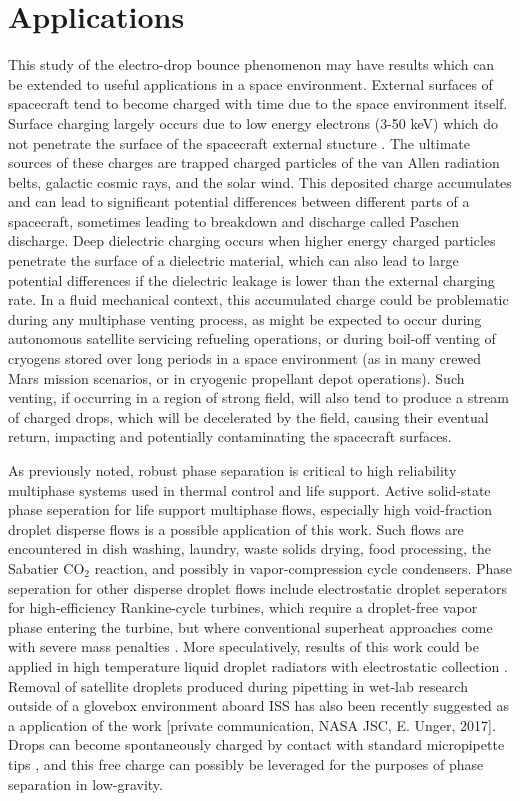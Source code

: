 \documentclass[12pt,a4paper,oneside]{book}
\begin{document}
\section{Applications}
This study of the electro-drop bounce phenomenon may have results which can be extended to useful applications in a space environment. External surfaces of spacecraft tend to become charged with time due to the space environment itself. Surface charging largely occurs due to low energy electrons (3-50 keV) which do not penetrate the surface of the spacecraft external stucture \cite{czepiela_charging_1997}. The ultimate sources of these charges are trapped charged particles of the van Allen radiation belts, galactic cosmic rays, and the solar wind. This deposited charge accumulates and can lead to significant potential differences between different parts of a spacecraft, sometimes leading to breakdown and discharge called Paschen discharge. Deep dielectric charging occurs when higher energy charged particles penetrate the surface of a dielectric material, which can also lead to large potential differences if the dielectric leakage is lower than the external charging rate. In a fluid mechanical context, this accumulated charge could be problematic during any multiphase venting process, as might be expected to occur during autonomous satellite servicing refueling operations, or during boil-off venting of cryogens stored over long periods in a space environment (as in many crewed Mars mission scenarios, or in cryogenic propellant depot operations). Such venting, if occurring in a region of strong field, will also tend to produce a stream of charged drops, which will be decelerated by the field, causing their eventual return, impacting and potentially contaminating the spacecraft surfaces.

As previously noted, robust phase separation is critical to high reliability multiphase systems used in thermal control and life support. Active solid-state phase seperation for life support multiphase flows, especially high void-fraction droplet disperse flows is a possible application of this work. Such flows are encountered in dish washing, laundry, waste solids drying, food processing, the Sabatier CO$_2$ reaction, and possibly in vapor-compression cycle condensers. Phase seperation for other disperse droplet flows include electrostatic droplet seperators for high-efficiency Rankine-cycle turbines, which require a droplet-free vapor phase entering the turbine, but where conventional superheat approaches come with severe mass penalties \cite{unterberg_zero_1962}. More speculatively, results of this work could be applied in high temperature liquid droplet radiators with electrostatic collection \cite{white_liquid_1987}. Removal of satellite droplets produced during pipetting in wet-lab research outside of a glovebox environment aboard ISS has also been recently suggested as a application of the work [private communication, NASA JSC, E. Unger, 2017]. Drops can become spontaneously charged by contact with standard micropipette tips \cite{choi_spontaneous_2013}, and this free charge can possibly be leveraged for the purposes of phase separation in low-gravity. 
\end{document}
